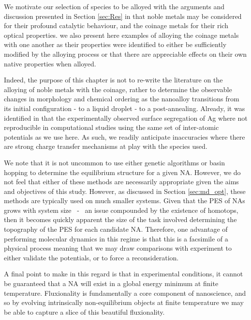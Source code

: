 We motivate our selection of species to be alloyed with the arguments and discussion presented in Section \ref{sec:Res} in that noble metals may be considered for their profound catalytic behaviour, and the coinage metals for their rich optical properties. we also present here examples of alloying the coinage metals with one another as their properties were identified to either be sufficiently modified by the alloying process or that there are appreciable effects on their own native properties when alloyed.

Indeed, the purpose of this chapter is not to re-write the literature on the alloying of noble metals with the coinage, rather to determine the observable changes in morphology and chemical ordering as the nanoalloy transitions from its initial configuration - to a liquid droplet - to a post-annealing. Already, it was identified in \cite{AgAuNanoparticles} that the experimentally observed surface segregation of Ag where not reproducible in computational studies using the same set of inter-atomic potentials as we use here. As such, we readily anticipate inaccuracies where there are strong charge transfer mechanisms at play with the species used.

We note that it is not uncommon to use either genetic algorithms \cite{YANG2018371,Fra_Ricardo_Review,Oakley2013-zl} or basin hopping \cite{Fra_Review,B204069G,doi:10.1021/jp207246m} to determine the equilibrium structure for a given NA. However, we do not feel that either of these methods are necessarily appropriate given the aims and objectives of this study. However, as discussed in Section \ref{sec:md_opt}, these methods are typically used on much smaller systems. Given that the PES of NAs grows with system size ~-~ an issue compounded by the existence of homotops, then it becomes quickly apparent the size of the task involved determining the topography of the PES for each candidate NA. Therefore, one advantage of performing molecular dynamics in this regime is that this is a facsimile of a physical process meaning that we may draw comparisons with experiment to either validate the potentials, or to force a reconsideration. 

A final point to make in this regard is that in experimental conditions, it cannot be guaranteed that a NA will exist in a global energy minimum at finite temperature. Fluxionality is fundamentally a core component of nanoscience, and so by evolving intrinsically non-equilibrium objects at finite temperature we may be able to capture a slice of this beautiful fluxionality.

